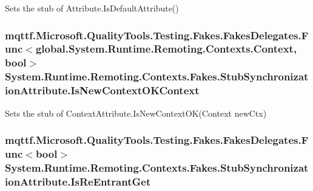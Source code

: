 Sets the stub of Attribute.\-Is\-Default\-Attribute()

\hypertarget{class_system_1_1_runtime_1_1_remoting_1_1_contexts_1_1_fakes_1_1_stub_synchronization_attribute_a9b38c9f651b509d52760506f89a68206}{
\subsubsection[{Is\-New\-Context\-O\-K\-Context}]{\setlength{\rightskip}{0pt plus 5cm}mqttf.\-Microsoft.\-Quality\-Tools.\-Testing.\-Fakes.\-Fakes\-Delegates.\-Func$<$global.\-System.\-Runtime.\-Remoting.\-Contexts.\-Context, bool$>$ System.\-Runtime.\-Remoting.\-Contexts.\-Fakes.\-Stub\-Synchronization\-Attribute.\-Is\-New\-Context\-O\-K\-Context}}\label{class_system_1_1_runtime_1_1_remoting_1_1_contexts_1_1_fakes_1_1_stub_synchronization_attribute_a9b38c9f651b509d52760506f89a68206}


Sets the stub of Context\-Attribute.\-Is\-New\-Context\-O\-K(\-Context new\-Ctx)

\hypertarget{class_system_1_1_runtime_1_1_remoting_1_1_contexts_1_1_fakes_1_1_stub_synchronization_attribute_a4ca0e4320272cdcfcd3281ac0521b6be}{
\subsubsection[{Is\-Re\-Entrant\-Get}]{\setlength{\rightskip}{0pt plus 5cm}mqttf.\-Microsoft.\-Quality\-Tools.\-Testing.\-Fakes.\-Fakes\-Delegates.\-Func$<$bool$>$ System.\-Runtime.\-Remoting.\-Contexts.\-Fakes.\-Stub\-Synchronization\-Attribute.\-Is\-Re\-Entrant\-Get}}\label{class_system_1_1_runtime_1_1_remoting_1_1_contexts_1_1_fakes_1_1_stub_synchronization_attribute_a4ca0e4320272cdcfcd3281ac0521b6be}


